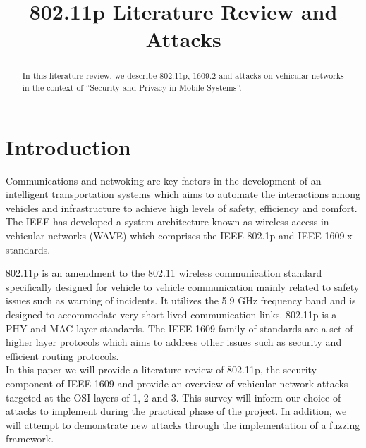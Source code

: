 \documentclass[conference]{IEEEtran}
\title{802.11p Literature Review and Attacks}
\author{\IEEEauthorblockN{Aniket Chaudhari and Alvin Cai and Wouter de Groot and Erik Schneider}
\IEEEauthorblockA{Technische Universiteit Eindhoven\\
Eindhoven, The Netherlands\\
\\
September 30, 2014}}
\begin{document}
\maketitle

\begin{abstract}
In this literature review, we describe 802.11p, 1609.2 and attacks on vehicular networks in the context of “Security and Privacy in Mobile Systems”.
\end{abstract}

\section{Introduction}

\begin{comment}
I think we should amend the first paragraph to provide an overview of VANET in general before jumping into 802.11p.

I made some amendments to para 2 and 3, to align to the modified scope. i.e. 
a) The literature review is the main meat of this project
b) It must provide a comprehensive survey of different attacks 
c) We can explain the attacks we want to implement in more detail
d) Focus on attacks in OSI layer 1-3
\end{comment}

Communications and netwoking are key factors in the development of an intelligent transportation systems which aims to automate the interactions among vehicles and infrastructure to achieve high levels of safety, efficiency and comfort. The IEEE has developed a system architecture known as wireless access in vehicular networks (WAVE) which comprises the IEEE 802.1p and IEEE 1609.x standards.

802.11p is an amendment to the 802.11 wireless communication standard specifically designed for vehicle to vehicle communication mainly related to safety issues such as warning of incidents. It utilizes the 5.9 GHz frequency band and is designed to accommodate very short-lived communication links. 802.11p is a PHY and MAC layer standards. The IEEE 1609 family of standards are a set of higher layer protocols which aims to address other issues such as security and efficient routing protocols.\\

In this paper we will provide a literature review of 802.11p, the security component of IEEE 1609 and provide an overview of vehicular network attacks targeted at the OSI layers of 1, 2 and 3. This survey will inform our choice of attacks to implement during the practical phase of the project. In addition, we will attempt to demonstrate new attacks through the implementation of a fuzzing framework.
\end{document}
